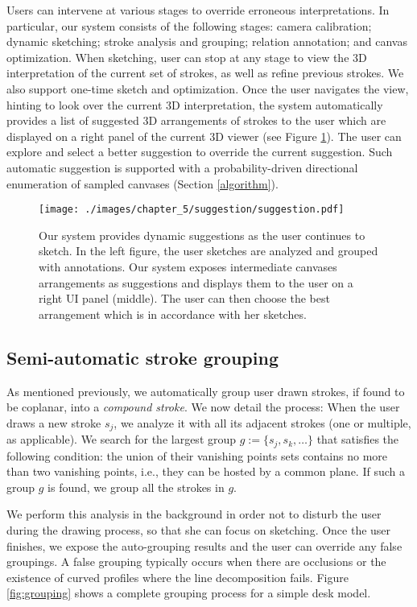 Users can intervene at various stages to override erroneous interpretations. In particular, our system consists of the following stages: camera calibration; dynamic sketching; stroke analysis and grouping; relation annotation; and canvas optimization. When sketching, user can stop at any stage to view the 3{D} interpretation of the current set of strokes, as well as refine previous strokes. We also support one-time sketch and optimization. Once the user navigates the view, hinting to look over the current 3D interpretation, the system automatically provides a list of suggested 3{D} arrangements of strokes to the user which are displayed on a right panel of the current 3{D} viewer (see Figure \ref{fig:suggestion}). The user can explore and select a better suggestion to override the current suggestion. Such automatic suggestion is supported with a probability-driven directional enumeration of sampled canvases (Section \ref{algorithm}).

\begin{figure}[t!]
  \texttt{[image: ./images/chapter\_5/suggestion/suggestion.pdf]}
  \caption{ Our system provides dynamic suggestions as the user continues to sketch. In the left figure, the user sketches are analyzed and grouped with annotations. Our system exposes intermediate canvases arrangements as suggestions and displays them to the user on a right UI panel (middle). The user can then choose the best arrangement which is in accordance with her sketches.
  \label{fig:suggestion}
  }
  \vnudge
\end{figure}


\subsection{Semi-automatic stroke grouping}

As mentioned previously, we automatically group user drawn strokes, if found to be coplanar, into a \emph{compound stroke}. We now detail the process: When the user draws a new stroke $s_j$, we analyze it with all its adjacent strokes (one or multiple, as applicable). We search for the largest group $g := \{s_j, s_k, \dots\}$ that satisfies the following condition: the union of their vanishing points sets contains no more than two vanishing points, i.e., they can be hosted by a common plane. If such a group $g$ is found, we group all the strokes in $g$.

We perform this analysis in the background in order not to disturb the user during the drawing process, so that she can focus on sketching. Once the user finishes, we expose the auto-grouping results and the user can override any false groupings. A false grouping typically occurs when there are occlusions or the existence of curved profiles where the line decomposition fails. Figure \ref{fig:grouping} shows a complete grouping process for a simple desk model.

